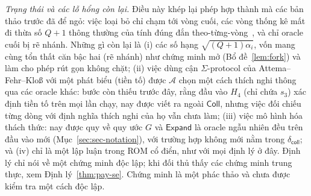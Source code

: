 \noindent\emph{Trạng thái và các lỗ hổng còn lại.} Điều này khép lại phép hợp
thành mà các bản thảo trước đã để ngỏ: việc loại bỏ chỉ chạm tới vòng cuối, các
vòng thống kê mất đi thừa số $Q+1$ thông thường của tính đúng đắn
theo-từng-vòng~\cite{ref:ccHLRR19}, và chỉ oracle cuối bị rẽ nhánh. Những gì
còn lại là (i) các số hạng \MSIS{} $\sqrt{(Q+1)\alpha_i}$, vốn mang cùng tổn
thất căn bậc hai (rẽ nhánh) như chứng minh mở
(Bổ đề~\ref{lem:fork}) và làm cho phép rút gọn không chặt;
(ii) việc dùng cận $\Sigma$-protocol của Attema--Fehr--Klo{\ss} với một phát
biểu (tiền tố) được $\mathcal A$ chọn một cách thích nghi thông qua các oracle
khác: bước còn thiếu trước đây, rằng đầu vào $H_4$ (chỉ chứa $s_3$) xác định
tiền tố trên mọi lần chạy, nay được viết ra ngoài $\mathsf{Coll}$, nhưng việc
đối chiếu từng dòng với định nghĩa thích nghi của họ vẫn chưa làm;
(iii) việc mô hình hóa thách thức: nay được quy về quy ước $G$ và
$\mathsf{Expand}$ là oracle ngẫu nhiên đều trên đầu vào mới
(Mục~\ref{sec:sec-notation}), với trường hợp không mới nằm trong
$\delta_{\mathsf{coll}}$; và (iv) chỉ là một lập luận trong ROM cổ điển, như
với mọi định lý ở đây. Định lý chỉ nói về một chứng minh độc lập; khi đối thủ
thấy các chứng minh trung thực, xem Định lý~\ref{thm:pay-se}. Chứng minh là một
phác thảo và chưa được kiểm tra một cách độc lập.


